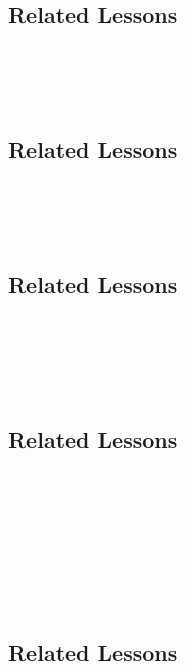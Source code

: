\subsection{Related Lessons}
\fourhOne{}\\
\fouriOne{}\\
\fourFKFourtySeven{}\\
%
\subsection{Related Lessons}
\fourhOne{}\\
\fouriOne{}\\
\fourFKFourtySeven{}\\
%
\subsection{Related Lessons}
\fouraFive{}\\
\fouriOne{}\\
\fourhOne{}\\
\fourFKFourtySeven{}\\
%
\subsection{Related Lessons}
\fouraOne{}\\
\fouraTwo{}\\
\fouraThree{}\\
\fouraFour{}\\
\fouraFive{}\\
\fouraNine{}\\
\fourdTwentyOne{}\\
%
\subsection{Related Lessons} 
\fourhOne{}\\
\fourhFour{}\\
\fouriFive{}\\
\fourjFifteen{}\\
\fourFKFourtySeven{}\\
